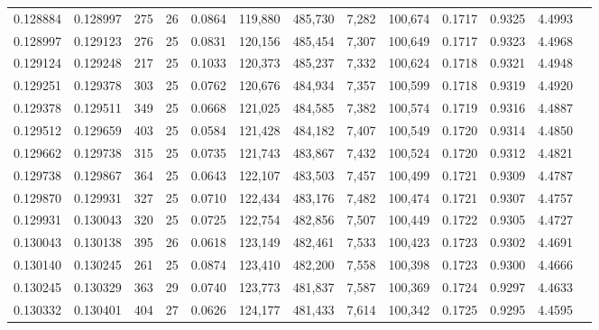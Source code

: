 \begin{tabular}{rrrrrrrrrrrrr}
0.128884 & 0.128997 & 275 &  26 &                                     0.0864 & 119,880 & 485,730 &   7,282 & 100,674 & 0.1717 & 0.9325 & 4.4993 \\
0.128997 & 0.129123 & 276 &  25 &                                     0.0831 & 120,156 & 485,454 &   7,307 & 100,649 & 0.1717 & 0.9323 & 4.4968 \\
0.129124 & 0.129248 & 217 &  25 &                                     0.1033 & 120,373 & 485,237 &   7,332 & 100,624 & 0.1718 & 0.9321 & 4.4948 \\
0.129251 & 0.129378 & 303 &  25 &                                     0.0762 & 120,676 & 484,934 &   7,357 & 100,599 & 0.1718 & 0.9319 & 4.4920 \\
0.129378 & 0.129511 & 349 &  25 &                                     0.0668 & 121,025 & 484,585 &   7,382 & 100,574 & 0.1719 & 0.9316 & 4.4887 \\
0.129512 & 0.129659 & 403 &  25 &                                     0.0584 & 121,428 & 484,182 &   7,407 & 100,549 & 0.1720 & 0.9314 & 4.4850 \\
0.129662 & 0.129738 & 315 &  25 &                                     0.0735 & 121,743 & 483,867 &   7,432 & 100,524 & 0.1720 & 0.9312 & 4.4821 \\
0.129738 & 0.129867 & 364 &  25 &                                     0.0643 & 122,107 & 483,503 &   7,457 & 100,499 & 0.1721 & 0.9309 & 4.4787 \\
0.129870 & 0.129931 & 327 &  25 &                                     0.0710 & 122,434 & 483,176 &   7,482 & 100,474 & 0.1721 & 0.9307 & 4.4757 \\
0.129931 & 0.130043 & 320 &  25 &                                     0.0725 & 122,754 & 482,856 &   7,507 & 100,449 & 0.1722 & 0.9305 & 4.4727 \\
0.130043 & 0.130138 & 395 &  26 &                                     0.0618 & 123,149 & 482,461 &   7,533 & 100,423 & 0.1723 & 0.9302 & 4.4691 \\
0.130140 & 0.130245 & 261 &  25 &                                     0.0874 & 123,410 & 482,200 &   7,558 & 100,398 & 0.1723 & 0.9300 & 4.4666 \\
0.130245 & 0.130329 & 363 &  29 &                                     0.0740 & 123,773 & 481,837 &   7,587 & 100,369 & 0.1724 & 0.9297 & 4.4633 \\
0.130332 & 0.130401 & 404 &  27 &                                     0.0626 & 124,177 & 481,433 &   7,614 & 100,342 & 0.1725 & 0.9295 & 4.4595 \\

\end{tabular}

